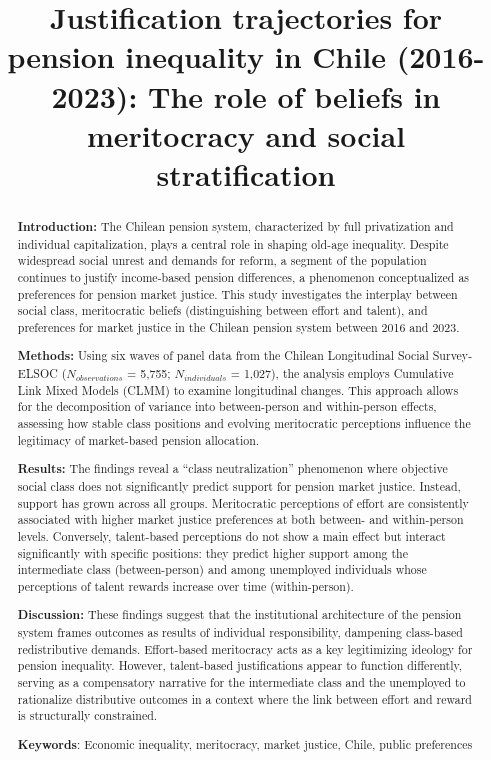 \documentclass[
  12pt,
]{article}
\title{Justification trajectories for pension inequality in Chile
(2016-2023): The role of beliefs in meritocracy and social
stratification}
\date{}
\begin{document}
\maketitle
\begin{abstract}
\textbf{Introduction:} The Chilean pension system, characterized by full
privatization and individual capitalization, plays a central role in
shaping old-age inequality. Despite widespread social unrest and demands
for reform, a segment of the population continues to justify
income-based pension differences, a phenomenon conceptualized as
preferences for pension market justice. This study investigates the
interplay between social class, meritocratic beliefs (distinguishing
between effort and talent), and preferences for market justice in the
Chilean pension system between 2016 and 2023.

\textbf{Methods:} Using six waves of panel data from the Chilean
Longitudinal Social Survey-ELSOC (\(N_{observations}\) = 5,755;
\(N_{individuals}\) = 1,027), the analysis employs Cumulative Link Mixed
Models (CLMM) to examine longitudinal changes. This approach allows for
the decomposition of variance into between-person and within-person
effects, assessing how stable class positions and evolving meritocratic
perceptions influence the legitimacy of market-based pension allocation.

\textbf{Results:} The findings reveal a ``class neutralization''
phenomenon where objective social class does not significantly predict
support for pension market justice. Instead, support has grown across
all groups. Meritocratic perceptions of effort are consistently
associated with higher market justice preferences at both between- and
within-person levels. Conversely, talent-based perceptions do not show a
main effect but interact significantly with specific positions: they
predict higher support among the intermediate class (between-person) and
among unemployed individuals whose perceptions of talent rewards
increase over time (within-person).

\textbf{Discussion:} These findings suggest that the institutional
architecture of the pension system frames outcomes as results of
individual responsibility, dampening class-based redistributive demands.
Effort-based meritocracy acts as a key legitimizing ideology for pension
inequality. However, talent-based justifications appear to function
differently, serving as a compensatory narrative for the intermediate
class and the unemployed to rationalize distributive outcomes in a
context where the link between effort and reward is structurally
constrained.

\textbf{Keywords}: Economic inequality, meritocracy, market justice,
Chile, public preferences
\end{abstract}
\end{document}
